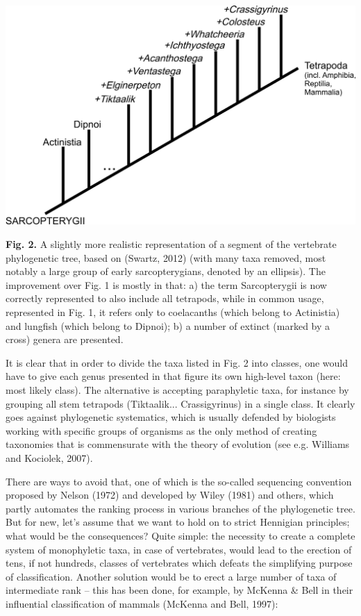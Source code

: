 \begin{artengenv}
{\centering  \includegraphics{Lamzaorg-img002.jpg} \par}
\textbf{Fig. 2.} A slightly more realistic representation of a segment of the vertebrate phylogenetic tree, based on
\label{ref:RNDPuknxVrJnD}(Swartz, 2012) (with many taxa removed, most notably a large group of early sarcopterygians,
denoted by an ellipsis). The improvement over Fig. 1 is mostly in that: a) the term Sarcopterygii is now correctly
represented to also include all tetrapods, while in common usage, represented in Fig. 1, it refers only to coelacanths
(which belong to Actinistia) and lungfish (which belong to Dipnoi); b) a number of extinct (marked by a cross) genera
are presented.

It is clear that in order to divide the taxa listed in Fig. 2 into classes, one would have to give each genus presented
in that figure its own high-level taxon (here: most likely class). The alternative is accepting paraphyletic taxa, for
instance by grouping all stem tetrapods (Tiktaalik... Crassigyrinus) in a single class. It clearly goes against
phylogenetic systematics, which is usually defended by biologists working with specific groups of organisms as the only
method of creating taxonomies that is commensurate with the theory of evolution \label{ref:RNDkC4ruFguZT}(see e.g.
Williams and Kociolek, 2007).

There are ways to avoid that, one of which is the so-called sequencing convention proposed by Nelson
\label{ref:RNDHQubFlpSOG}(1972) and developed by Wiley \label{ref:RNDoeFoXTp1sn}(1981) and others, which partly
automates the ranking process in various branches of the phylogenetic tree. But for new, let’s assume that we want to
hold on to strict Hennigian principles; what would be the consequences? Quite simple: the necessity to create a
complete system of monophyletic taxa, in case of vertebrates, would lead to the erection of tens, if not hundreds,
classes of vertebrates which defeats the simplifying purpose of classification. Another solution would be to erect a
large number of taxa of intermediate rank – this has been done, for example, by McKenna \& Bell in their influential
classification of mammals \label{ref:RNDTh5Uw8JZAm}(McKenna and Bell, 1997):


\end{artengenv}
